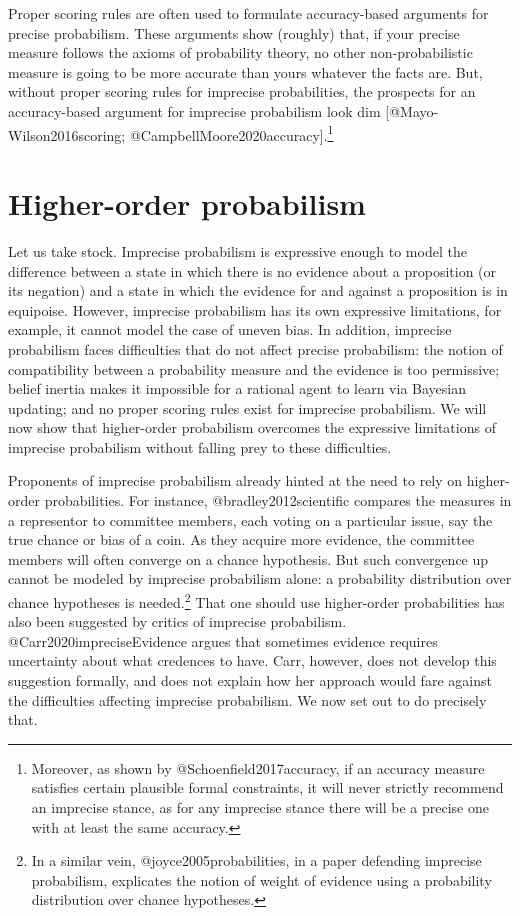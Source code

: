 \documentclass[
  letterpaper,
  DIV=11,
  numbers=noendperiod]{scrartcl}
\begin{document}
Proper scoring rules are often used to formulate accuracy-based
arguments for precise probabilism. These arguments show (roughly) that,
if your precise measure follows the axioms of probability theory, no
other non-probabilistic measure is going to be more accurate than yours
whatever the facts are. But, without proper scoring rules for imprecise
probabilities, the prospects for an accuracy-based argument for
imprecise probabilism look dim {[}@Mayo-Wilson2016scoring;
@CampbellMoore2020accuracy{]}.\footnote{Moreover, as shown by
  @Schoenfield2017accuracy, if an accuracy measure satisfies certain
  plausible formal constraints, it will never strictly recommend an
  imprecise stance, as for any imprecise stance there will be a precise
  one with at least the same accuracy.}

\section{Higher-order probabilism}\label{higher-order-probabilism}

\label{sec:higher-order}

Let us take stock. Imprecise probabilism is expressive enough to model
the difference between a state in which there is no evidence about a
proposition (or its negation) and a state in which the evidence for and
against a proposition is in equipoise. However, imprecise probabilism
has its own expressive limitations, for example, it cannot model the
case of uneven bias. In addition, imprecise probabilism faces
difficulties that do not affect precise probabilism: the notion of
compatibility between a probability measure and the evidence is too
permissive; belief inertia makes it impossible for a rational agent to
learn via Bayesian updating; and no proper scoring rules exist for
imprecise probabilism. We will now show that higher-order probabilism
overcomes the expressive limitations of imprecise probabilism without
falling prey to these difficulties.

Proponents of imprecise probabilism already hinted at the need to rely
on higher-order probabilities. For instance, @bradley2012scientific
compares the measures in a representor to committee members, each voting
on a particular issue, say the true chance or bias of a coin. As they
acquire more evidence, the committee members will often converge on a
chance hypothesis. But such convergence up cannot be modeled by
imprecise probabilism alone: a probability distribution over chance
hypotheses is needed.\footnote{In a similar vein,
  @joyce2005probabilities, in a paper defending imprecise probabilism,
  explicates the notion of weight of evidence using a probability
  distribution over chance hypotheses.} That one should use higher-order
probabilities has also been suggested by critics of imprecise
probabilism. @Carr2020impreciseEvidence argues that sometimes evidence
requires uncertainty about what credences to have. Carr, however, does
not develop this suggestion formally, and does not explain how her
approach would fare against the difficulties affecting imprecise
probabilism. We now set out to do precisely that.
\end{document}
